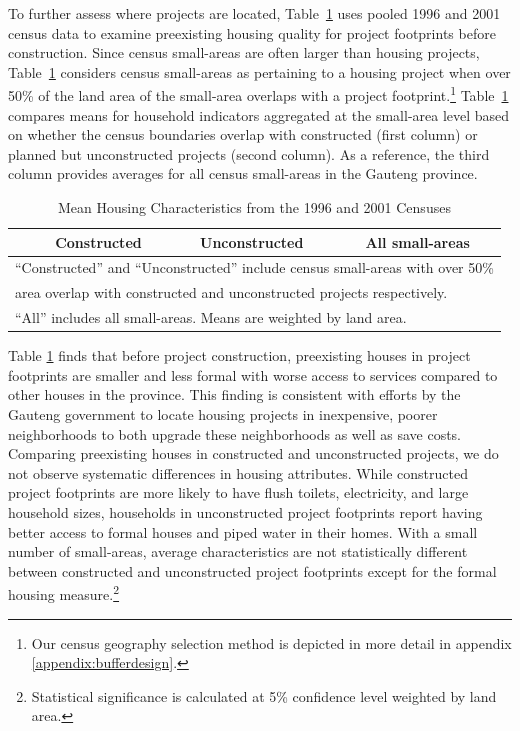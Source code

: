 \documentclass[12pt]{article}
\begin{document}

To further assess where projects are located, Table~\ref{table:projectdescriptivescensus} uses pooled 1996 and 2001 census data to examine preexisting housing quality for project footprints before construction.  Since census small-areas are often larger than housing projects, Table~\ref{table:projectdescriptivescensus} considers census small-areas as pertaining to a housing project when over 50\% of the land area of the small-area overlaps with a project footprint.\footnote{Our census geography selection method is depicted in more detail in appendix \ref{appendix:bufferdesign}.}  Table~\ref{table:projectdescriptivescensus} compares means for household indicators aggregated at the small-area level based on whether the census boundaries overlap with constructed (first column) or planned but unconstructed projects (second column).  As a reference, the third column provides averages for all census small-areas in the Gauteng province.

\begin{table}[h!]
	\centering
	\caption{Mean Housing Characteristics from the 1996 and 2001 Censuses}\label{table:projectdescriptivescensus}
\vspace{-2mm}
\begin{tabular}{l*{1}{ccc}}
\toprule
& Constructed & Unconstructed & All small-areas \\
\midrule
 
\bottomrule
\multicolumn{4}{l}{\scriptsize ``Constructed'' and ``Unconstructed'' include census small-areas with over 50\% } \\ [-.5em]
\multicolumn{4}{l}{\scriptsize  area overlap with constructed and unconstructed projects respectively. } \\ [-.5em]
\multicolumn{4}{l}{\scriptsize ``All''  includes all small-areas.  Means are weighted by land area.}
\end{tabular}
\end{table}


Table \ref{table:projectdescriptivescensus} finds that before project construction, preexisting houses in project footprints are smaller and less formal with worse access to services compared to other houses in the province.  This finding is consistent with efforts by the Gauteng government to locate housing projects in inexpensive, poorer neighborhoods to both upgrade these neighborhoods as well as save costs.  Comparing preexisting houses in constructed and unconstructed projects, we do not observe systematic differences in housing attributes.  While constructed project footprints are more likely to have flush toilets, electricity, and large household sizes, households in unconstructed project footprints report having better access to formal houses and piped water in their homes.  With a small number of small-areas, average characteristics are not statistically different between constructed and unconstructed project footprints except for the formal housing measure.\footnote{Statistical significance is calculated at 5\% confidence level weighted by land area.}
\end{document}
